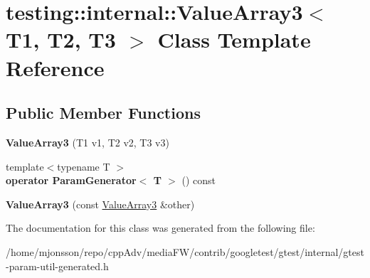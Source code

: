 \hypertarget{classtesting_1_1internal_1_1ValueArray3}{}\section{testing\+:\+:internal\+:\+:Value\+Array3$<$ T1, T2, T3 $>$ Class Template Reference}
\label{classtesting_1_1internal_1_1ValueArray3}
\subsection*{Public Member Functions}
\begin{DoxyCompactItemize}
\item 
\mbox{\label{classtesting_1_1internal_1_1ValueArray3_aa83b0671fed7a231ba127600c904246d}} 
{\bfseries Value\+Array3} (T1 v1, T2 v2, T3 v3)
\item 
\mbox{\label{classtesting_1_1internal_1_1ValueArray3_a4922d1cf7af801e82bdead15817b23fc}} 
{\footnotesize template$<$typename T $>$ }\\{\bfseries operator Param\+Generator$<$ T $>$} () const
\item 
\mbox{\label{classtesting_1_1internal_1_1ValueArray3_a742d8b00de6b63b020740ebbc7bc8d31}} 
{\bfseries Value\+Array3} (const \hyperlink{classtesting_1_1internal_1_1ValueArray3}{Value\+Array3} \&other)
\end{DoxyCompactItemize}


The documentation for this class was generated from the following file\+:\begin{DoxyCompactItemize}
\item 
/home/mjonsson/repo/cpp\+Adv/media\+F\+W/contrib/googletest/gtest/internal/gtest-\/param-\/util-\/generated.\+h\end{DoxyCompactItemize}
